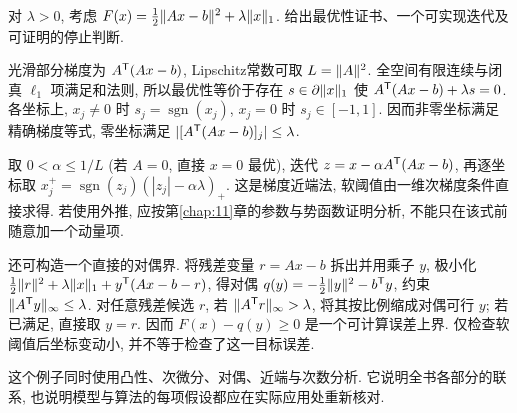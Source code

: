\begin{example}
对 $\lambda>0$, 考虑 $F(x)=\tfrac12\lVert Ax-b\rVert^2+\lambda\lVert x\rVert_1$. 给出最优性证书、一个可实现迭代及可证明的停止判断.
\end{example}
\begin{solution}
光滑部分梯度为 $A^{\mathsf T}(Ax-b)$, Lipschitz常数可取 $L=\lVert A\rVert^2$. 全空间有限连续与闭真 $\ell_1$ 项满足和法则, 所以最优性等价于存在 $s\in\partial\lVert x\rVert_1$ 使 $A^{\mathsf T}(Ax-b)+\lambda s=0$. 各坐标上, $x_j\ne0$ 时 $s_j=\operatorname{sgn}(x_j)$, $x_j=0$ 时 $s_j\in[-1,1]$. 因而非零坐标满足精确梯度等式, 零坐标满足 $|[A^{\mathsf T}(Ax-b)]_j|\le\lambda$.

取 $0<\alpha\le1/L$ (若 $A=0$, 直接 $x=0$ 最优), 迭代 $z=x-\alpha A^{\mathsf T}(Ax-b)$, 再逐坐标取 $x_j^+=\operatorname{sgn}(z_j)(|z_j|-\alpha\lambda)_+$. 这是梯度近端法, 软阈值由一维次梯度条件直接求得. 若使用外推, 应按第\ref{chap:11}章的参数与势函数证明分析, 不能只在该式前随意加一个动量项.

还可构造一个直接的对偶界. 将残差变量 $r=Ax-b$ 拆出并用乘子 $y$, 极小化 $\tfrac12\lVert r\rVert^2+\lambda\lVert x\rVert_1+y^{\mathsf T}(Ax-b-r)$, 得对偶 $q(y)=-\tfrac12\lVert y\rVert^2-b^{\mathsf T} y$, 约束 $\lVert A^{\mathsf T} y\rVert_\infty\le\lambda$. 对任意残差候选 $r$, 若 $\lVert A^{\mathsf T} r\rVert_\infty>\lambda$, 将其按比例缩成对偶可行 $y$; 若已满足, 直接取 $y=r$. 因而 $F(x)-q(y)\ge0$ 是一个可计算误差上界. 仅检查软阈值后坐标变动小, 并不等于检查了这一目标误差.
\end{solution}
这个例子同时使用凸性、次微分、对偶、近端与次数分析. 它说明全书各部分的联系, 也说明模型与算法的每项假设都应在实际应用处重新核对.
